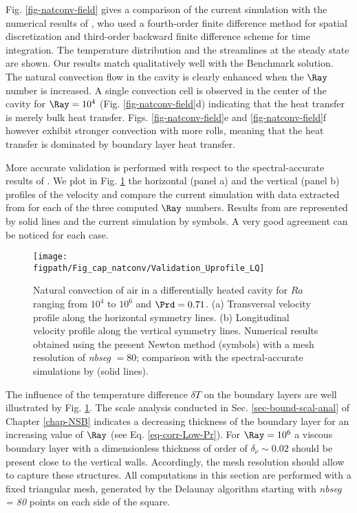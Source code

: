 Fig. \ref{fig-natconv-field} gives a comparison of the current simulation with the numerical results of \cite{Wakashima-2004}, who
used a fourth-order finite difference method for spatial discretization and third-order backward finite difference scheme for time integration.
The temperature distribution and the streamlines at the steady state are shown.
Our results match qualitatively well with the Benchmark solution.
The natural convection flow in the cavity is clearly enhanced when the $\Ray$ number is increased.
A single convection cell is observed in the center of the cavity for $\Ray = 10^4$ (Fig. \ref{fig-natconv-field}d) indicating that the heat transfer is merely bulk heat transfer.
Figs. \ref{fig-natconv-field}e and \ref{fig-natconv-field}f however exhibit stronger convection with more rolls, meaning that the heat transfer is dominated by boundary layer heat transfer.

More accurate validation is performed with respect to the spectral-accurate results of \cite{LeQuere91}.
We plot in Fig. \ref{fig-T1-prof} the horizontal (panel a) and the vertical (panel b)  profiles of the velocity and compare the current simulation with data extracted from  \cite{LeQuere91} for each of the three computed $\Ray$ numbers.
Results from \cite{LeQuere91} are represented by solid lines and the current simulation by symbols.
A very good agreement can  be noticed for each case.

\begin{figure}
	\begin{center}
		\texttt{[image: \\figpath/Fig\_cap\_natconv/Validation\_Uprofile\_LQ]} 
	\end{center}
	\caption{Natural convection of air in a differentially heated cavity for $Ra$ ranging from $10^4$ to $10^6$ and $\Prd = 0.71$. (a) Transversal velocity profile along the  horizontal symmetry lines. (b) Longitudinal velocity profile along the vertical symmetry lines. Numerical results obtained using the present Newton method (symbols) with a mesh resolution of {\em nbseg} $=80$; comparison with the spectral-accurate simulations by \cite{LeQuere91} (solid lines).}
	\label{fig-T1-prof}
\end{figure}

The influence of the temperature difference $\delta T$ on the boundary layers are well illustrated by Fig.  \ref{fig-T1-prof}.
The scale analysis conducted in Sec. \ref{sec-bound-scal-anal} of Chapter \ref{chap-NSB} indicates a decreasing thickness of the boundary layer for an increasing value of $\Ray$ (see Eq. \ref{eq-corr-Low-Pr}). 
For $\Ray = 10^6$ a viscous boundary layer with a dimensionless thickness of order of $\delta_\nu \sim 0.02$ should be present close to the vertical walls.
Accordingly, the mesh resolution should allow to capture these structures.
All computations in this section are performed with a fixed triangular mesh, generated by the Delaunay algorithm starting with {\em nbseg = 80} points on each side of the square.


